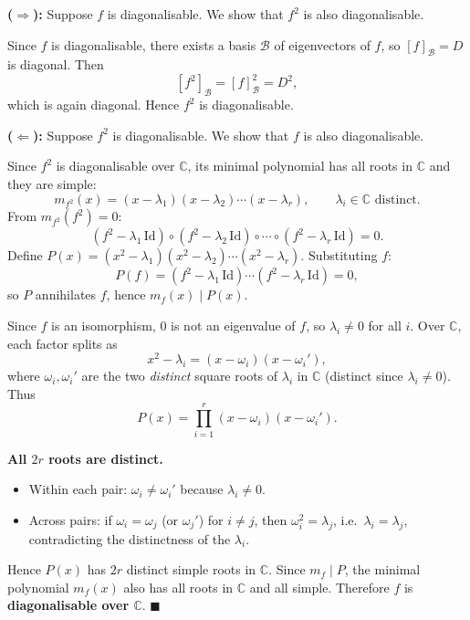 \begin{proofbox}
\textbf{($\Rightarrow$):}  Suppose $f$ is diagonalisable.
We show that $f^2$ is also diagonalisable.

Since $f$ is diagonalisable, there exists a basis $\mathcal{B}$ of
eigenvectors of $f$, so $[f]_{\mathcal{B}} = D$ is diagonal.  Then
\[
  [f^2]_{\mathcal{B}} = [f]_{\mathcal{B}}^2 = D^2,
\]
which is again diagonal.  Hence $f^2$ is diagonalisable.

\bigskip
\textbf{($\Leftarrow$):}  Suppose $f^2$ is diagonalisable.
We show that $f$ is also diagonalisable.

Since $f^2$ is diagonalisable over $\mathbb{C}$, its minimal polynomial has all roots
in $\mathbb{C}$ and they are simple:
\[
  m_{f^2}(x) = (x-\lambda_1)(x-\lambda_2)\cdots(x-\lambda_r),
  \qquad \lambda_i\in\mathbb{C} \text{ distinct}.
\]
From $m_{f^2}(f^2)=0$:
\[
  (f^2-\lambda_1\,\mathrm{Id})\circ(f^2-\lambda_2\,\mathrm{Id})\circ\cdots\circ(f^2-\lambda_r\,\mathrm{Id}) = 0.
\]
Define $P(x) = (x^2-\lambda_1)(x^2-\lambda_2)\cdots(x^2-\lambda_r)$.
Substituting $f$:
\[
  P(f) = (f^2-\lambda_1\,\mathrm{Id})\cdots(f^2-\lambda_r\,\mathrm{Id}) = 0,
\]
so $P$ annihilates $f$, hence $m_f(x)\mid P(x)$.

\medskip
Since $f$ is an isomorphism, $0$ is not an eigenvalue of $f$, so $\lambda_i\neq 0$
for all $i$.  Over $\mathbb{C}$, each factor splits as
\[
  x^2-\lambda_i = (x-\omega_i)(x-\omega_i'),
\]
where $\omega_i,\omega_i'$ are the two \emph{distinct} square roots of $\lambda_i$
in $\mathbb{C}$ (distinct since $\lambda_i\neq 0$).  Thus
\[
  P(x) = \prod_{i=1}^r (x-\omega_i)(x-\omega_i').
\]

\textbf{All $2r$ roots are distinct.}
\begin{itemize}[leftmargin=1.5em,itemsep=2pt]
  \item Within each pair: $\omega_i\neq\omega_i'$ because $\lambda_i\neq 0$.
  \item Across pairs: if $\omega_i = \omega_j$ (or $\omega_j'$) for $i\neq j$,
        then $\omega_i^2 = \lambda_j$, i.e.\ $\lambda_i=\lambda_j$, contradicting
        the distinctness of the $\lambda_i$.
\end{itemize}

Hence $P(x)$ has $2r$ distinct simple roots in $\mathbb{C}$.  Since $m_f\mid P$, the
minimal polynomial $m_f(x)$ also has all roots in $\mathbb{C}$ and all simple.
Therefore $f$ is \textbf{diagonalisable over $\mathbb{C}$}. \hfill$\blacksquare$
\end{proofbox}